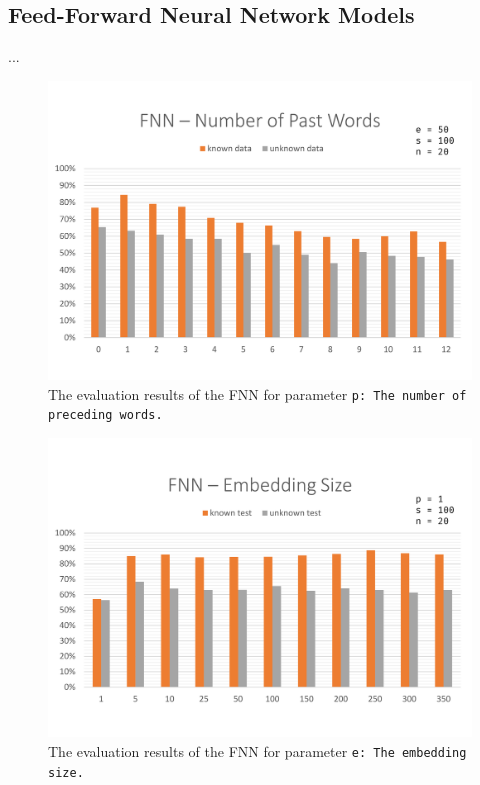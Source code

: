 \subsection{Feed-Forward Neural Network Models}\label{c.evaluation.results.fnn}
...

\begin{figure}[H]
	\includegraphics[width=\textwidth]{images/evaluation_fnn_p}
	\caption[FNN Evaluation: Number of Past Words]{The evaluation results of the FNN for parameter \tt{p}: The number of preceding words.}
	\label{f.evaluation.fnn.p}
\end{figure}

\begin{figure}[H]
	\includegraphics[width=\textwidth]{images/evaluation_fnn_e}
	\caption[FNN Evaluation: Number of Past Words]{The evaluation results of the FNN for parameter \tt{e}: The embedding size.}
	\label{f.evaluation.fnn.e}
\end{figure}

